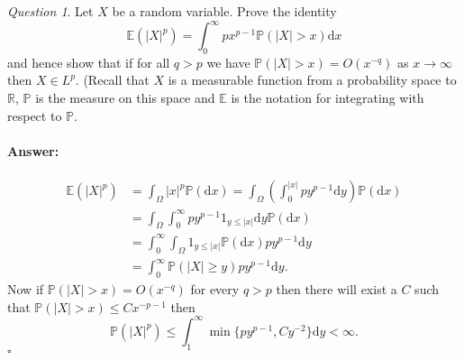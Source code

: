 \documentclass[11pt]{article}
\theoremstyle{definition}
\theoremstyle{remark}
\newtheorem{q}{Question}
\newenvironment{ans}{\paragraph{Answer:}}{\hfill$\square$\vspace{10pt}}
\begin{document}
\begin{q}
Let $X$ be a random variable. Prove the identity
\[ \mathbb{E}(|X|^p) = \int_0^\infty p x^{p-1} \mathbb{P}(|X| > x) \mathrm{d}x \] and hence show that if for all $q >p$ we have $\mathbb{P}(|X| > x) = O(x^{-q})$ as $x \rightarrow \infty$ then $X \in L^p$. (Recall that $X$ is a measurable function from a probability space to $\mathbb{R}$, $\mathbb{P}$ is the measure on this space and $\mathbb{E}$ is the notation for integrating with respect to $\mathbb{P}$.
\end{q}
\begin{ans}
\begin{align*}
\mathbb{E}(|X|^p) & = \int_\Omega |x|^p \mathbb{P}(\mathrm{d}x) = \int_\Omega \left( \int_0^{|x|} p y^{p-1} \mathrm{d}y \right) \mathbb{P}(\mathrm{d}x) \\
& = \int_{\Omega} \int_0^\infty py^{p-1} 1_{y \leq |x|} \mathrm{d}y \mathbb{P}(\mathrm{d}x) \\
&= \int_0^\infty \int_\Omega 1_{y \leq |x|} \mathbb{P}( \mathrm{d}x) py^{p-1} \mathrm{d}y\\
& = \int_0^\infty \mathbb{P}(|X| \geq y) p y^{p-1} \mathrm{d}y.
\end{align*}
Now if $\mathbb{P}(|X| > x) = O(x^{-q})$ for every $q>p$ then there will exist a $C$ such that $\mathbb{P}(|X| > x) \leq Cx^{-p-1}$ then
\[ \mathbb{P}(|X|^p) \leq  \int_1^\infty \min\{ py^{p-1}, Cy^{-2}\} \mathrm{d}y < \infty. \]
\end{ans}
\end{document}
